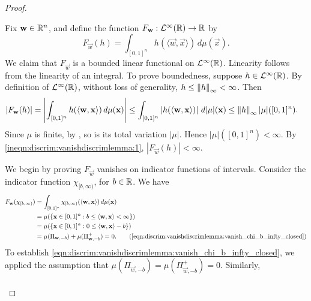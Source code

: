 \begin{proof}
\setcounter{step}{0}
\begin{step}
Fix $\mathbf{w} \in {\mathbb R}^n$, and define the function $F_\mathbf{w} : {\mathcal {L}^\infty}({\mathbb R}) \to {\mathbb R}$ by \[
    F_{\vec{w}}(h) = \int_{[0,1]^n} h ( \langle \vec{w}, \vec{x} \rangle  ) \, d \mu  (\vec{x}).
\]
We claim that $F_\vec{w}$ is a bounded linear functional on ${\mathcal {L}^\infty}({\mathbb R})$. Linearity follows from the linearity of an integral. To prove boundedness, suppose $h \in {\mathcal {L}^\infty}({\mathbb R})$. By definition of ${\mathcal {L}^\infty}({\mathbb R})$, without loss of generality, $h \leq \left\lVert h\right\rVert_\infty < \infty$. Then \begin{align}
    \label{ineqn:discrim:vanishdiscrimlemma:1}
     | F_{\mathbf{w}}(h) | &= \left | \int_{[0,1]^n} h ( \langle \mathbf{w}, \mathbf{x} \rangle) \, d \mu  (\mathbf{x}) \right | \leq  \int_{[0,1]^n} \left |  h ( \langle \mathbf{w}, \mathbf{x} \rangle)  \right |  \, d  |\mu| (\mathbf{x}) \leq \left\lVert h\right\rVert_\infty  |\mu| ([0,1]^n).
\end{align}
Since $\mu$ is finite, by , so is its total variation $|\mu|$. Hence $ |\mu| ([0,1]^n) < \infty$. By \ref{ineqn:discrim:vanishdiscrimlemma:1}, $| F_{\vec{w}}(h) | < \infty$.
\end{step}
\begin{step}
We begin by proving $F_\vec{w}$ vanishes on indicator functions of intervals.
Consider the indicator function $\chi_{[b, \infty)}$, for $b \in {\mathbb R}$. We have
\begin{subequations}\label{eqn:discrim:vanishdiscrimlemma:vanish_chi_b_infty_closed}
\begin{align*}
    F_{\vec{w}}(\chi_{[b, \infty)}) &= \int_{[0,1]^n} \chi_{[b, \infty)}( \langle \vec{w}, \vec{x} \rangle  ) \, d \mu  (\vec{x}) \\
                                &= \mu (\left \{ \vec{x} \in [0,1]^n : b \leq \langle \vec{w}, \vec{x} \rangle < \infty  \right \}) \\
                                &= \mu (\left \{ \vec{x} \in [0,1]^n : 0 \leq \langle \vec{w}, \vec{x} \rangle -b\right \}) \\
                                &= \mu(\Pi_{\vec{w}, -b}) +  \mu(\Pi_{\vec{w}, -b}^{+}) = 0.
     \tag{\ref{eqn:discrim:vanishdiscrimlemma:vanish_chi_b_infty_closed}} 
\end{align*}
\end{subequations}
To establish \ref{eqn:discrim:vanishdiscrimlemma:vanish_chi_b_infty_closed}, we applied the assumption that $\mu(\Pi_{\vec{w}, -b}) = \mu(\Pi_{\vec{w}, -b}^{+}) = 0$. Similarly, \begin{align}

\end{align}
\end{step}
\end{proof}
